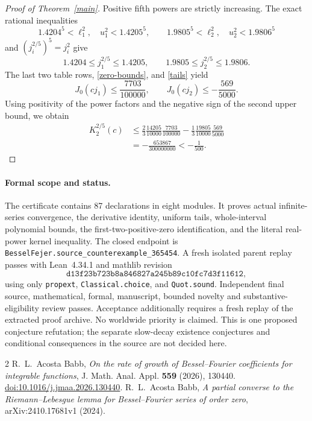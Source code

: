 \documentclass[11pt]{article}
\newcommand{\J}{J_0}
\begin{document}
\begin{proof}[Proof of Theorem~\ref{main}]
Positive fifth powers are strictly increasing. The exact rational inequalities
\[
 1.4204^5<\ell_1^2,\quad u_1^2<1.4205^5,\qquad
 1.9805^5<\ell_2^2,\quad u_2^2<1.9806^5
\]
and $(j_i^{2/5})^5=j_i^2$ give
\[
 1.4204\leq j_1^{2/5}\leq1.4205,\qquad
 1.9805\leq j_2^{2/5}\leq1.9806.
\]
The last two table rows, \eqref{zero-bounds}, and \eqref{tails} yield
\[
 \J(cj_1)\leq\frac{7703}{100000},\qquad
 \J(cj_2)\leq-\frac{569}{5000}.
\]
Using positivity of the power factors and the negative sign of the second
upper bound, we obtain
\begin{align*}
 K_2^{2/5}(c)
 &\leq\frac23\frac{14205}{10000}\frac{7703}{100000}
       -\frac13\frac{19805}{10000}\frac{569}{5000}\\
 &=-\frac{653867}{300000000}<-\frac1{500}.
\end{align*}
\end{proof}

\paragraph{Formal scope and status.}
The certificate contains 87 declarations in eight modules. It proves actual
infinite-series convergence, the derivative identity, uniform tails,
whole-interval polynomial bounds, the first-two-positive-zero identification,
and the literal real-power kernel inequality. The closed endpoint is
\texttt{BesselFejer.source\_counterexample\_365454}.
A fresh isolated parent replay passes with Lean~4.34.1 and mathlib revision
\[\texttt{d13f23b723b8a846827a245b89c10fc7d3f11612},\]
using only \texttt{propext}, \texttt{Classical.choice}, and \texttt{Quot.sound}.
Independent final source, mathematical, formal, manuscript, bounded novelty
and substantive-eligibility review passes. Acceptance additionally requires a
fresh replay of the extracted proof archive. No worldwide priority is claimed.
This is one proposed conjecture refutation; the separate slow-decay existence
conjectures and conditional consequences in the source are not decided here.

\begin{thebibliography}{2}
 R.~L.~Acosta Babb,
\emph{On the rate of growth of Bessel--Fourier coefficients for integrable functions},
J. Math. Anal. Appl. \textbf{559} (2026), 130440.
\href{https://doi.org/10.1016/j.jmaa.2026.130440}{doi:10.1016/j.jmaa.2026.130440}.
 R.~L.~Acosta Babb,
\emph{A partial converse to the Riemann--Lebesgue lemma for Bessel--Fourier
series of order zero}, arXiv:2410.17681v1 (2024).
\end{thebibliography}
\end{document}

